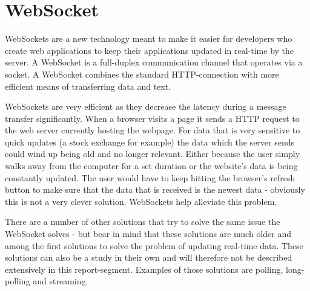\section{WebSocket}

WebSockets are a new technology meant to make it easier for developers who 
create web applications to keep their applications updated in real-time by the 
server\cite{andersen10}. A WebSocket is a full-duplex communication channel 
that operates via a socket\cite{lubbersgreco}. A WebSocket combines the 
standard HTTP-connection with more efficient means of transferring data and 
text\cite{lubbersgreco}.


WebSockets are very efficient as they decrease the latency during a message 
transfer significantly\cite{lubbersgreco}. When a browser visits a page it 
sends a HTTP request to the web server currently hosting the 
webpage\cite{lubbersgreco}. For data that is very sensitive to quick updates 
(a stock exchange for example) the data which the server sends could wind up 
being old and no longer relevant. Either because the user simply walks away 
from the computer for a set duration or the website's data is being constantly 
updated\cite{lubbersgreco}. The user would have to keep hitting the browser's 
refresh button to make sure that the data that is received is the newest data 
- obviously this is not a very clever solution\cite{lubbersgreco}. WebSockets 
help alleviate this problem.


There are a number of other solutions that try to solve the same issue the 
WebSocket solves - but bear in mind that these solutions are much older and 
among the first solutions to solve the problem of updating real-time 
data\cite{lubbersgreco}. These solutions can also be a study in their own and 
will therefore not be described extensively in this report-segment. Examples 
of those solutions are polling, long-polling and streaming.







